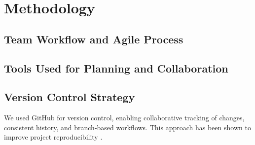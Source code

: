 \chapter{Methodology}
\section{Team Workflow and Agile Process}
\section{Tools Used for Planning and Collaboration}

\section{Version Control Strategy}
We used GitHub for version control, enabling collaborative tracking of changes, consistent history, and branch-based workflows. This approach has been shown to improve project reproducibility \cite{xi2017multifunctional}.
